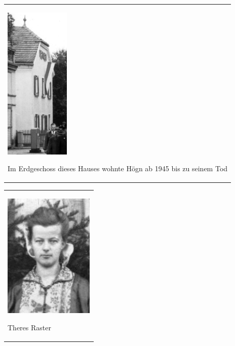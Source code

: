 \begin{center}
\begin{minipage}{3.491cm}
\begin{flushleft}
\tablefirsthead{}
\tablehead{}
\tabletail{}
\tablelasttail{}
\begin{supertabular}{m{3.291cm}}

\includegraphics[width=3.108cm,height=7.408cm]{pictures/zulassungsarbeit-img038.jpg}

Im Erdgeschoss dieses Hauses wohnte
Högn ab 1945 bis zu seinem Tod\\
\end{supertabular}
\end{flushleft}
\end{minipage}
\end{center}
\begin{flushleft}
\tablefirsthead{}
\tablehead{}
\tabletail{}
\tablelasttail{}
\begin{supertabular}{m{4.6330004cm}}

\begin{center}

\includegraphics[width=4.3cm,height=5.973cm]{pictures/zulassungsarbeit-img039.jpg}

\end{center}
Theres Raster\\
\end{supertabular}
\end{flushleft}

